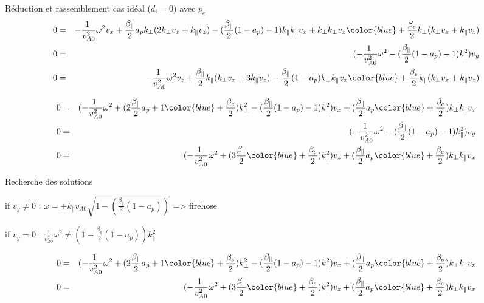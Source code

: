 Réduction et rassemblement cas idéal ($d_i=0$) avec $p_e$
\begin{eqnarray}
 0 &=& - \frac{1 }{v^2_{A0}}\omega^2 v_x + \frac{\beta_{\parallel}}{2} a_p k_{\perp}(2k_{\perp} v_x +k_{\parallel} v_z)  - (\frac{\beta_{\parallel}}{2}  (1 - a_p) -1) k_{\parallel} k_{\parallel} v_x +k_{\perp}k_{\perp} v_x {\color{blue} + \frac{\beta_e}{2} k_{\perp}(k_{\perp} v_x +k_{\parallel} v_z)} \nonumber\\
 0 &=& (- \frac{1 }{v^2_{A0}} \omega^2   - (\frac{\beta_{\parallel}}{2}  (1 - a_p) -1)k^2_{\parallel} ) v_y  \nonumber \\
 0 &=& - \frac{1 }{v^2_{A0}} \omega^2 v_z  +\frac{\beta_{\parallel}}{2} k_{\parallel} (k_{\perp} v_x + 3 k_{\parallel} v_z) - \frac{\beta_{\parallel}}{2}  (1 - a_p) k_{\perp} k_{\parallel} v_x {\color{blue}+ \frac{\beta_e}{2} k_{\parallel}(k_{\perp} v_x +k_{\parallel} v_z)}  \nonumber
\end{eqnarray}

\begin{eqnarray}
0 &=& ( - \frac{1 }{v^2_{A0}}\omega^2+(2\frac{\beta_{\parallel}}{2} a_p +1{\color{blue}+ \frac{\beta_e}{2}})k^2_{\perp} - (\frac{\beta_{\parallel}}{2}  (1 - a_p) -1) k^2_{\parallel}     )v_x + (\frac{\beta_{\parallel}}{2} a_p{\color{blue}+ \frac{\beta_e}{2}}) k_{\perp}k_{\parallel}v_z \nonumber\\
 0 &=& (- \frac{1 }{v^2_{A0}} \omega^2   - (\frac{\beta_{\parallel}}{2}  (1 - a_p) -1)k^2_{\parallel}  ) v_y   \nonumber\\
 0 &=& (- \frac{1 }{v^2_{A0}} \omega^2  + (3\frac{\beta_{\parallel}}{2} {\color{blue}+ \frac{\beta_e}{2}}) k^2_{\parallel}  ) v_z +(\frac{\beta_{\parallel}}{2} a_p{\color{blue}+ \frac{\beta_e}{2}}) k_{\perp} k_{\parallel} v_x   \nonumber
\end{eqnarray}

Recherche des solutions

if $v_y \neq 0$ : $\omega = \pm k_{\parallel} v_{A0} \sqrt{1-(\frac{\beta_{\parallel}}{2} (1 - a_p) )} $ => firehose

if $v_y = 0$ : $\frac{1}{v^2_{A0}} \omega^2  \neq  (1- \frac{\beta_{\parallel}}{2} (1 - a_p) ) k^2_{\parallel} $

\begin{eqnarray}
0 &=& ( - \frac{1 }{v^2_{A0}}\omega^2+(2\frac{\beta_{\parallel}}{2} a_p +1{\color{blue}+ \frac{\beta_e}{2}})k^2_{\perp} - (\frac{\beta_{\parallel}}{2}  (1 - a_p) -1) k^2_{\parallel}   )v_x + (\frac{\beta_{\parallel}}{2} a_p{\color{blue}+ \frac{\beta_e}{2}})k_{\perp}k_{\parallel}v_z \nonumber\\
 0 &=& (- \frac{1 }{v^2_{A0}} \omega^2  + (3\frac{\beta_{\parallel}}{2} {\color{blue}+ \frac{\beta_e}{2}}) k^2_{\parallel}  ) v_z +(\frac{\beta_{\parallel}}{2} a_p{\color{blue}+ \frac{\beta_e}{2}}) k_{\perp} k_{\parallel} v_x   \nonumber
\end{eqnarray}


